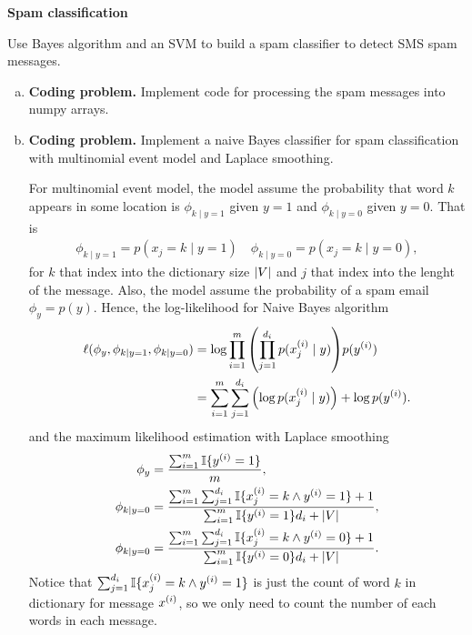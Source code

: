 \documentclass[12pt,letterpaper,boxed]{hmcpset}
\newcommand{\ind}[1]{\mathbb{I}\{#1\}}
\begin{document}
\begin{problem}[Problem 6]
  \textbf{Spam classification}

  Use Bayes algorithm and an SVM to build a spam classifier to detect SMS spam messages. 
\end{problem}

\begin{solution}
  \begin{enumerate}[(a)]
    \item \textbf{Coding problem.} Implement code for processing the spam messages into numpy arrays.
    
    \item \textbf{Coding problem.} Implement a naive Bayes classifier for spam classification with multinomial event model and Laplace smoothing.
    
    For multinomial event model, the model assume the probability that word $k$ appears in some location is $\phi_{k \mid y = 1}$ given $y = 1$ and $\phi_{k \mid y = 0}$ given $y = 0$. That is 
    \[
    \begin{aligned}
      \phi_{k \mid y = 1} = p(x_j = k \mid y = 1) \quad \phi_{k \mid y = 0} = p(x_j = k \mid y = 0),
    \end{aligned}
    \]
    for $k$ that index into the dictionary size $\left\lvert V\right\rvert$ and $j$ that index into the lenght of the message. Also, the model assume the probability of a spam email $\phi_y = p(y)$. Hence, the log-likelihood for Naive Bayes algorithm
    \[
    \begin{aligned}
      \ell(\phi_y, \phi_{k \mid y = 1}, \phi_{k \mid y = 0}) &= \log \prod_{i=1}^m \qty(\prod_{j=1}^{d_i} p(x_j^{(i)} \mid y)) p(\yy) \\
      &= \sum_{i=1}^m \sum_{j=1}^{d_i} \qty (\log p(x_j^{(i)} \mid y)) + \log p(\yy).
    \end{aligned}
    \]
    and the maximum likelihood estimation with Laplace smoothing
    \[
    \begin{aligned}
      \phi_y &= \frac{\sum_{i=1}^m \ind{\yy = 1} }{m}, \\
      \phi_{k \mid y = 0} &= \frac{\sum_{i=1}^m \sum_{j=1}^{d_i} \ind{x_j^{(i)} = k \land \yy = 1} + 1}{\sum_{i=1}^m \ind {\yy = 1} d_i + \abs{V}}, \\
      \phi_{k \mid y = 0} &= \frac{\sum_{i=1}^m \sum_{j=1}^{d_i} \ind{x_j^{(i)} = k \land \yy = 0} + 1}{\sum_{i=1}^m \ind {\yy = 0} d_i + \abs{V}}. \\
    \end{aligned}
    \]
    Notice that $\sum_{j=1}^{d_i} \ind{x_j^{(i)} = k \land \yy = 1}$ is just the count of word $k$ in dictionary for message $\xx$, so we only need to count the number of each words in each message.


\end{enumerate}
\end{solution}
\end{document}
